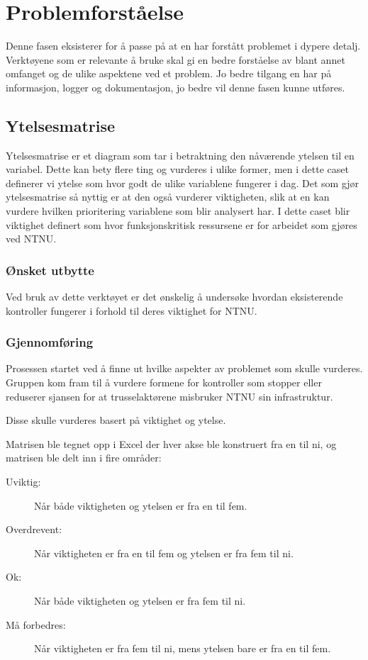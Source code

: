 \chapter{Problemforståelse}
Denne fasen eksisterer for å passe på at en har forstått problemet i dypere detalj. Verktøyene som er relevante å bruke skal gi en bedre forståelse av blant annet omfanget og de ulike aspektene ved et problem. Jo bedre tilgang en har på informasjon, logger og dokumentasjon, jo bedre vil denne fasen kunne utføres. 


\section{Ytelsesmatrise}
Ytelsesmatrise er et diagram som tar i betraktning den nåværende ytelsen til en variabel. Dette kan bety flere ting og vurderes i ulike former, men i dette caset definerer vi ytelse som hvor godt de ulike variablene fungerer i dag. Det som gjør ytelsesmatrise så nyttig er at den også vurderer viktigheten, slik at en kan vurdere hvilken prioritering variablene som blir analysert har. I dette caset blir viktighet definert som hvor funksjonskritisk ressursene er for arbeidet som gjøres ved NTNU.

\subsection{Ønsket utbytte}
Ved bruk av dette verktøyet er det ønskelig å undersøke hvordan eksisterende kontroller fungerer i forhold til deres viktighet for NTNU. 

\subsection{Gjennomføring}
Prosessen startet ved å finne ut hvilke aspekter av problemet som skulle vurderes. Gruppen kom fram til å vurdere formene for kontroller som stopper eller reduserer sjansen for at trusselaktørene misbruker NTNU sin infrastruktur. 

Disse skulle vurderes basert på viktighet og ytelse. 

Matrisen ble tegnet opp i Excel der hver akse ble konstruert fra en til ni, og matrisen ble delt inn i fire områder:
\begin{description}
    \item[Uviktig:] Når både viktigheten og ytelsen er fra en til fem.
    \item[Overdrevent:] Når viktigheten er fra en til fem og ytelsen er fra fem til ni.
    \item[Ok:] Når både viktigheten og ytelsen er fra fem til ni.
    \item[Må forbedres:] Når viktigheten er fra fem til ni, mens ytelsen bare er fra en til fem.
\end{description}

